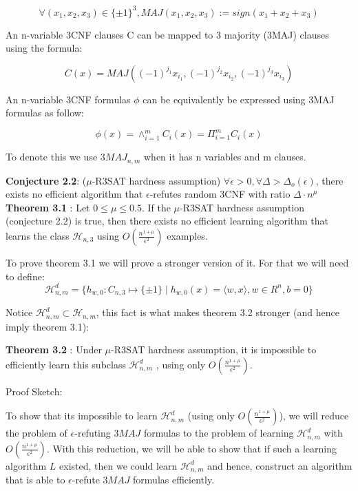\documentclass[12pt]{report}
\begin{document}
$$\forall (x_1, x_2, x_3) \in \{ \pm 1 \}^3, MAJ(x_1, x_2, x_3 ) := sign(x_1 + x_2 + x_3 )$$

An n-variable 3CNF clauses C can be mapped to 3 majority (3MAJ) clauses using the formula:

$$ C(x) = MAJ( (-1)^{j_1}x_{i_1} , (-1)^{j_2}x_{i_2} , (-1)^{j_3}x_{i_3} )$$

An n-variable 3CNF formulas $\phi$ can be equivalently be expressed using 3MAJ formulas as follow:

$$ \phi(x) = \wedge^m_{i=1} C_{i}(x)  = \Pi^m_{i=1} C_{i}(x) $$

To denote this we use $3MAJ_{n,m}$ when it has n variables and m clauses.

\textbf{Conjecture 2.2}: ($\mu$-R3SAT hardness assumption) $\forall \epsilon > 0, \forall \Delta > \Delta_o(\epsilon) $, there exists no efficient algorithm that $\epsilon$-refutes random 3CNF with ratio $\Delta \cdot n^{\mu}$  
\textbf{Theorem 3.1 }: Let $0 \leq \mu \leq 0.5$. If the $\mu$-R3SAT hardness assumption (conjecture 2.2) is true, then there exists no efficient learning algorithm that learns the class $\mathcal{H}_{n,3}$ using $O \left(  \frac{n^{1 + \mu }}{\epsilon^2} \right)$ examples.

To prove theorem 3.1 we will prove a stronger version of it. For that we will need to define:
$$ \mathcal{H}^d_{n,m} = \{ h_{w,0} : C_{n, 3} \mapsto \{ \pm 1\} \mid h_{w,0}(x) = \langle w, x \rangle, w \in R^n, b = 0 \}$$

Notice $\mathcal{H}^d_{n,m} \subset \mathcal{H}_{n,m}$, this fact is what makes theorem 3.2 stronger (and hence imply theorem 3.1):

\textbf{Theorem 3.2 }: Under $\mu$-R3SAT hardness assumption, it is impossible to efficiently learn this subclass  $\mathcal{H}^d_{n,m}$ , using only $O \left(  \frac{n^{1 + \mu }}{\epsilon^2} \right)$.

Proof Sketch:

To show that its impossible to learn $\mathcal{H}^d_{n,m}$ (using only $O \left(  \frac{n^{1 + \mu }}{\epsilon^2} \right)$), we will reduce the problem of $\epsilon$-refuting $3MAJ$ formulas to the problem of learning $\mathcal{H}^d_{n,m}$ with $O \left(  \frac{n^{1 + \mu }}{\epsilon^2} \right)$. With this reduction, we will be able to show that if such a learning algorithm $L$ existed, then we could learn $\mathcal{H}^d_{n,m}$ and hence, construct an algorithm that is able to $\epsilon$-refute $3MAJ$ formulas efficiently.
\end{document}
